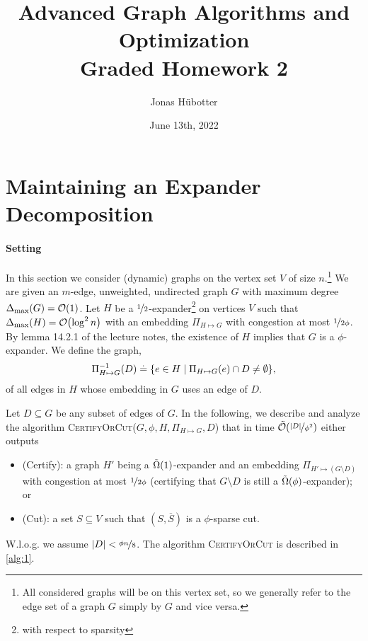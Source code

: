 \documentclass[nobib]{tufte-handout}
\title[Graded Homework 2]{Advanced Graph Algorithms and Optimization \\ Graded Homework 2}
\author{Jonas Hübotter}
\date{June 13th, 2022}
\newcommand{\embed}{\Pi_{H \mapsto G}}
\newcommand{\invembed}{\inv{\Pi}_{H \mapsto G}(D)}
\newcommand{\GmD}{G \setminus D}
\newcommand{\newembed}{\Pi_{H' \mapsto (\GmD)}}
\newcommand{\cut}{(S, \overline{S})}
\begin{document}
\maketitle

\section{Maintaining an Expander Decomposition}
\paragraph{Setting} In this section we consider (dynamic) graphs on the vertex set $V$ of size $n$.\footnote{All considered graphs will be on this vertex set, so we generally refer to the edge set of a graph $G$ simply by $G$ and vice versa.} We are given an $m$-edge, unweighted, undirected graph $G$ with maximum degree $\Delta_{\max}(G) = \LandauO{1}$. Let $H$ be a $\nicefrac{1}{2}$-expander\footnote{with respect to sparsity} on vertices $V$ such that $\Delta_{\max}(H) = \LandauO{\log^2 n}$ with an embedding $\embed$ with congestion at most $\nicefrac{1}{2\phi}$. By lemma 14.2.1 of the lecture notes, the existence of $H$ implies that $G$ is a $\phi$-expander. We define the graph, \begin{align}
    \invembed \defeq \{e \in H \mid \Pi_{H \mapsto G}(e) \cap D \neq \emptyset\},
\end{align} of all edges in $H$ whose embedding in $G$ uses an edge of $D$.

Let $D \subseteq G$ be any subset of edges of $G$. In the following, we describe and analyze the algorithm \textsc{CertifyOrCut($G, \phi, H, \Pi_{H \mapsto G}, D$)} that in time $\TildeLandauO{\nicefrac{|D|}{\phi^2}}$ either outputs \begin{itemize}
    \item (Certify): a graph $H'$ being a $\TildeLandauOmega{1}$-expander and an embedding $\newembed$ with congestion at most $\nicefrac{1}{2\phi}$ (certifying that $\GmD$ is still a $\TildeLandauOmega{\phi}$-expander); or
    \item (Cut): a set $S \subseteq V$ such that $\cut$ is a $\phi$-sparse cut.
\end{itemize} W.l.o.g. we assume $|D| < \nicefrac{\phi n}{8}$. The algorithm \textsc{CertifyOrCut} is described in \cref{alg:1}.
\end{document}
